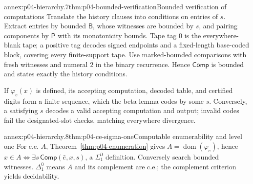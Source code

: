 \begin{annexitem}{annex:p04-hierarchy.7}{thm:p04-bounded-verification}{Bounded verification of computations}
Translate the history clauses into conditions on entries of \(s\).  Extract
entries by bounded \(\mathsf B\), whose witnesses are bounded by \(s\), and
pairing components by \(\mathsf P\) with its monotonicity bounds.  Tape tag
\(0\) is the everywhere-blank tape; a positive tag decodes signed endpoints
and a fixed-length base-coded block, covering every finite-support tape.  Use
marked-bounded comparisons with fresh witnesses and numeral \(\bar2\) in the
binary recurrence.  Hence \(\mathsf{Comp}\) is bounded and states exactly the
history conditions.

If \(\varphi_e(x)\) is defined, its accepting computation, decoded table, and
certified digits form a finite sequence, which the beta lemma codes by some
\(s\).  Conversely, a satisfying \(s\) decodes a valid accepting computation
and output; invalid codes fail the designated-slot checks, matching everywhere
divergence.
\end{annexitem}

\begin{annexitem}{annex:p04-hierarchy.8}{thm:p04-ce-sigma-one}{Computable enumerability and level one}
For c.e. \(A\), Theorem~\ref{thm:p04-enumeration} gives
\(A=\operatorname{dom}(\varphi_e)\), hence
\(x\in A\Leftrightarrow\exists s\,\mathsf{Comp}(\bar e,x,s)\), a
\(\Sigma^0_1\) definition.  Conversely search bounded witnesses.
\(\Delta^0_1\) means \(A\) and its complement are c.e.; the complement
criterion yields decidability.
\end{annexitem}
